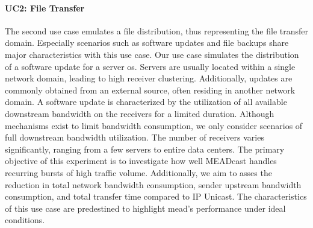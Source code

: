 \paragraph{UC2: File Transfer} %
\label{par:EX2: File Transfer}
The second use case emulates a file distribution, thus representing the
    file transfer domain.
Especially scenarios such as software updates and file backups share major
    characteristics with this use case.
Our use case simulates the distribution of a software update for a server
    \gls{os}.
Servers are usually located within a single network domain, leading to high
    receiver clustering.
Additionally, updates are commonly obtained from an external source, often
    residing in another network domain.
A software update is characterized by the utilization of all available
    downstream bandwidth on the receivers for a limited duration.
Although mechanisms exist to limit bandwidth consumption, we only consider 
    scenarios of full downstream bandwidth utilization.
The number of receivers varies significantly, ranging from a few servers to
    entire data centers.
The primary objective of this experiment is to investigate how well MEADcast
    handles recurring bursts of high traffic volume.
Additionally, we aim to asses the reduction in total network bandwidth
    consumption, sender upstream bandwidth consumption, and total transfer time 
    compared to IP Unicast.
The characteristics of this use case are predestined to highlight \gls{mead}'s
    performance under ideal conditions.


